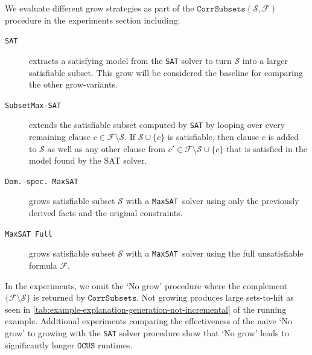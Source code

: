 \documentclass[twoside,11pt]{article}
\newcommand\m[1]{\mathcal{#1}}
\newcommand\comment[1]{\marginpar{\tiny #1}}
\renewcommand\comment[1]{#1}
\newcommand{\tias}[1]{{\comment{\color{blue}Tias:#1}}}
\newcommand\formula{\ensuremath{\m{F} }\xspace}
\newcommand\mm[1]{\ensuremath{#1}\xspace}
\newcommand\call[1]{\mm{\texttt{#1}}}
\newcommand\sat{\texttt{{SAT}}\xspace}
\newcommand\subsetmaxsat{\texttt{SubsetMax-SAT}}
\newcommand\grow{\mm{\call{Grow}}}
\newcommand\comus{\mm{\call{OCUS}}}
\newcommand\corrsubsets{\mm{\call{CorrSubsets}}}
\newcommand\maxsat{\texttt{MaxSAT}}
\newcommand\domspecmaxsat{\texttt{Dom.-spec.}~\texttt{MaxSAT}}
\newcommand\maxsatfull{\texttt{MaxSAT Full}}
\begin{document}
We evaluate different grow strategies as part of the $\corrsubsets(\m{S}, \formula)$ procedure
in the experiments section including:
\begin{description}
	\item[\sat] extracts a satisfying model from the \sat solver to turn $\m{S}$ into a larger satisfiable subset. This grow will be considered the baseline for comparing the other grow-variants.
	\item[\subsetmaxsat] extends the satisfiable subset computed by \sat by looping over every remaining clause $c \in \formula \setminus \m{S}$.  If $\m{S} \cup \{c\}$ is satisfiable, then clause $c$ is added to $\m{S}$ as well as any other clause from $c' \in \formula \setminus \m{S} \cup \{c\}$ that is satisfied in the model found by the SAT solver. 
	\item[\domspecmaxsat] grows satisfiable subset $\m{S}$ with a \maxsat~solver using only the previously derived facts and the original constraints. %
	\item[\maxsatfull] grows satisfiable subset $\m{S}$ with a \maxsat~solver using the full unsatisfiable formula $\mathcal{F}$.
\end{description} 
In the experiments, we omit the `No grow' procedure where the complement $\{\formula \setminus \m{S}\}$ is returned by \corrsubsets. Not growing produces large sets-to-hit as seen in \cref{tab:example-explanation-generation-not-incremental} of the running example.
Additional experiments comparing the effectiveness of the naive `No grow' to growing with the \sat solver procedure show that `No grow' leads to significantly longer \comus runtimes.
\end{document}
